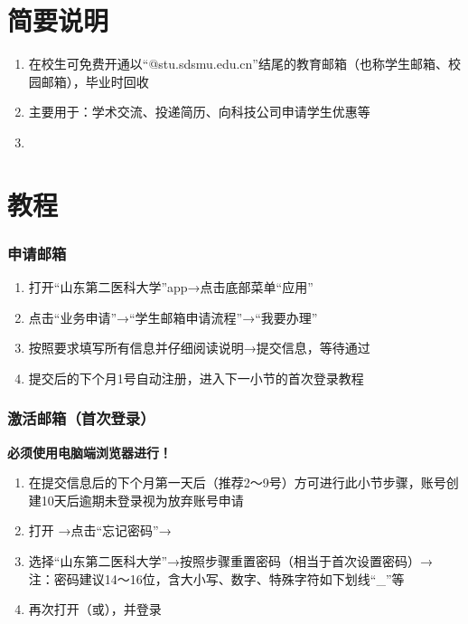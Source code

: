\part[简要说明]{简要说明}
\begin{enumerate}
    \item 在校生可免费开通以“@stu.sdsmu.edu.cn”结尾的教育邮箱（也称学生邮箱、校园邮箱），毕业时回收
    \item 主要用于：学术交流、投递简历、向科技公司申请学生优惠等
    \item {}
\end{enumerate}

\part[教程]{教程}

\section[申请邮箱]{申请邮箱}
\begin{enumerate}
    \item 打开“山东第二医科大学”app→点击底部菜单“应用”
    \item 点击“业务申请”→“学生邮箱申请流程”→“我要办理”
    \item 按照要求填写所有信息并仔细阅读说明→提交信息，等待通过
    \item 提交后的下个月1号自动注册，进入下一小节的首次登录教程
\end{enumerate}

\section[激活邮箱（首次登录）]{激活邮箱（首次登录）}
\textbf{必须使用电脑端浏览器进行！}

\begin{enumerate}
    \item 在提交信息后的下个月第一天后（推荐2～9号）方可进行此小节步骤，账号创建10天后逾期未登录视为放弃账号申请
    \item 打开 →点击“忘记密码”→
    \item 选择“山东第二医科大学”→按照步骤重置密码（相当于首次设置密码）→\\
          注：密码建议14～16位，含大小写、数字、特殊字符如下划线“\_”等
    \item 再次打开（或），并登录
\end{enumerate}

